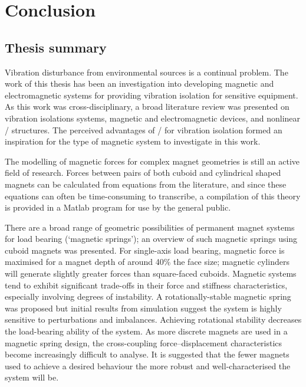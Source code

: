\documentclass[10pt,a4paper]{memoir}
\begin{document}
\chapter{Conclusion}


\section{Thesis summary}

Vibration disturbance from environmental sources is a continual problem.
The work of this thesis has been an investigation into developing magnetic and electromagnetic systems for providing vibration isolation for sensitive equipment.
As this work was cross-disciplinary, a broad literature review was presented on vibration isolations systems, magnetic and electromagnetic devices, and nonlinear \qzs/ structures.
The perceived advantages of \qzs/ for vibration isolation formed an inspiration for the type of magnetic system to investigate in this work.

The modelling of magnetic forces for complex magnet geometries is still an active field of research.
Forces between pairs of both cuboid and cylindrical shaped magnets can be calculated from equations from the literature, and since these equations can often be time-consuming to transcribe, a compilation of this theory is provided in a Matlab program for use by the general public.
 
There are a broad range of geometric possibilities of permanent magnet systems for load bearing (`magnetic springs'); an overview of such magnetic springs using cuboid magnets was presented.
For single-axis load bearing, magnetic force is maximised for a magnet depth of around 40\% the face size; magnetic cylinders will generate slightly greater forces than square-faced cuboids.
Magnetic systems tend to exhibit significant trade-offs in their force and stiffness characteristics, especially involving degrees of instability.
A rotationally-stable magnetic spring was proposed but initial results from simulation suggest the system is highly sensitive to perturbations and imbalances.
Achieving rotational stability decreases the load-bearing ability of the system.
As more discrete magnets are used in a magnetic spring design, the cross-coupling force--displacement characteristics become increasingly difficult to analyse.
It is suggested that the fewer magnets used to achieve a desired behaviour the more robust and well-characterised the system will be.
\end{document}
